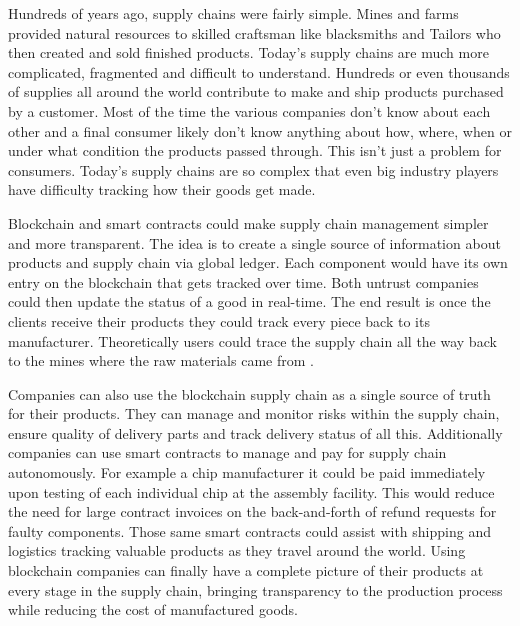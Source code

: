 
\acresetall 

Hundreds of years ago, supply chains were fairly simple. Mines and farms provided natural resources to skilled craftsman like blacksmiths and Tailors who then created and sold finished products. Today's supply chains are much more complicated, fragmented and difficult to understand. Hundreds or even thousands of supplies all around the world contribute to make and ship products purchased by a customer. Most of the time the various companies don't know about each other and a final consumer likely don't know anything about how, where, when or under what condition the products passed through. This isn't just a problem for consumers. Today's supply chains are so complex that even big industry players have difficulty tracking how their goods get made.

Blockchain and smart contracts could make supply chain management simpler and more transparent. The idea is to create a single source of information about products and supply chain via global ledger. Each component would have its own entry on the blockchain that gets tracked over time. Both untrust companies could then update the status of a good in real-time. The end result is once the clients receive their products they could track every piece back to its manufacturer. Theoretically users could trace the supply chain all the way back to the mines where the raw materials came from \cite{greve2018blockchain}.

Companies can also use the blockchain supply chain as a single source of truth for their products. They can manage and monitor risks within the supply chain, ensure quality of delivery parts and track delivery status of all this. Additionally companies can use smart contracts to manage and pay for supply chain autonomously. For example a chip manufacturer it could be paid immediately upon testing of each individual chip at the assembly facility. This would reduce the need for large contract invoices on the back-and-forth of refund requests for faulty components. Those same smart contracts could assist with shipping and logistics tracking valuable products as they travel around the world. Using blockchain companies can finally have a complete picture of their products at every stage in the supply chain, bringing transparency to the production process while reducing the cost of manufactured goods.